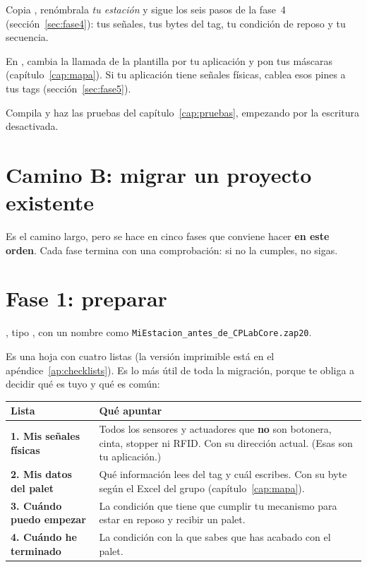 Copia , renómbrala \emph{tu estación} y sigue los seis pasos de la fase~4 (sección~\ref{sec:fase4}): tus señales, tus bytes del tag, tu condición de reposo y tu secuencia.

En , cambia la llamada de la plantilla por tu aplicación y pon tus máscaras (capítulo~\ref{cap:mapa}). Si tu aplicación tiene señales físicas, cablea esos pines a tus tags (sección~\ref{sec:fase5}).

Compila y haz las pruebas del capítulo~\ref{cap:pruebas}, empezando por la escritura desactivada.


\section{Camino B: migrar un proyecto existente}\label{sec:camino-b}
Es el camino largo, pero se hace en cinco fases que conviene hacer \textbf{en este orden}. Cada fase termina con una comprobación: si no la cumples, no sigas.

\section{Fase 1: preparar}\label{sec:fase1}
\reiniciapaso
{}
, tipo , con un nombre como \texttt{MiEstacion\_antes\_de\_CPLabCore.zap20}.

Es una hoja con cuatro listas (la versión imprimible está en el apéndice~\ref{ap:checklists}). Es lo más útil de toda la migración, porque te obliga a decidir qué es tuyo y qué es común:

\begin{center}
\small
\begin{tabularx}{\textwidth}{>{\bfseries}p{4.2cm}X}
\toprule
Lista & Qué apuntar \\
\midrule
1. Mis señales físicas & Todos los sensores y actuadores que \textbf{no} son botonera, cinta, stopper ni RFID. Con su dirección actual. (Esas son tu aplicación.) \\
2. Mis datos del palet & Qué información lees del tag y cuál escribes. Con su byte según el Excel del grupo (capítulo~\ref{cap:mapa}). \\
3. Cuándo puedo empezar & La condición que tiene que cumplir tu mecanismo para estar en reposo y recibir un palet. \\
4. Cuándo he terminado & La condición con la que sabes que has acabado con el palet. \\
\bottomrule
\end{tabularx}
\end{center}

